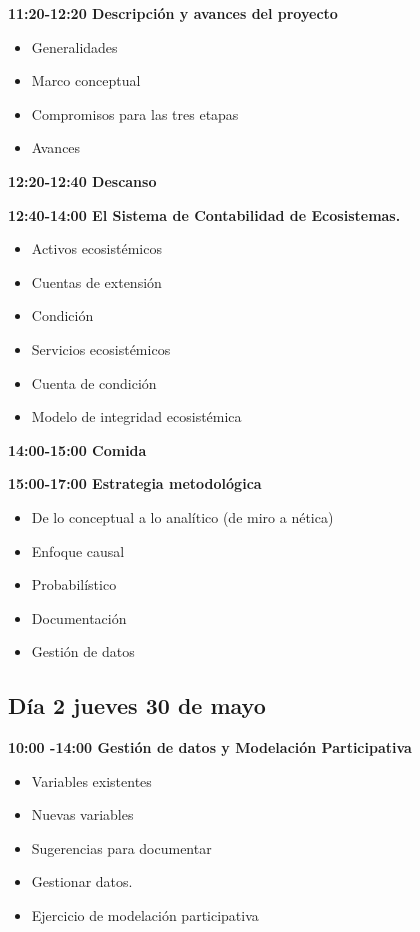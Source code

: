 \documentclass[
  letterpaper,
  DIV=11,
  numbers=noendperiod]{scrreprt}
\providecommand{\tightlist}{%
  \setlength{\itemsep}{0pt}\setlength{\parskip}{0pt}}\usepackage{longtable,booktabs,array}
\begin{document}
\textbf{11:20-12:20 Descripción y avances del proyecto}

\begin{itemize}
\tightlist
\item
  Generalidades
\item
  Marco conceptual
\item
  Compromisos para las tres etapas
\item
  Avances
\end{itemize}

\textbf{12:20-12:40 Descanso}

\textbf{12:40-14:00 El Sistema de Contabilidad de Ecosistemas.}

\begin{itemize}
\tightlist
\item
  Activos ecosistémicos
\item
  Cuentas de extensión
\item
  Condición
\item
  Servicios ecosistémicos
\item
  Cuenta de condición
\item
  Modelo de integridad ecosistémica
\end{itemize}

\textbf{14:00-15:00 Comida}

\textbf{15:00-17:00 Estrategia metodológica}

\begin{itemize}
\tightlist
\item
  De lo conceptual a lo analítico (de miro a nética)
\item
  Enfoque causal
\item
  Probabilístico
\item
  Documentación
\item
  Gestión de datos
\end{itemize}

\hypertarget{duxeda-2-jueves-30-de-mayo}{%
\subsection{Día 2 jueves 30 de mayo}\label{duxeda-2-jueves-30-de-mayo}}

\textbf{10:00 -14:00 Gestión de datos y Modelación Participativa}

\begin{itemize}
\tightlist
\item
  Variables existentes
\item
  Nuevas variables
\item
  Sugerencias para documentar
\item
  Gestionar datos.
\item
  Ejercicio de modelación participativa
\end{itemize}
\end{document}
